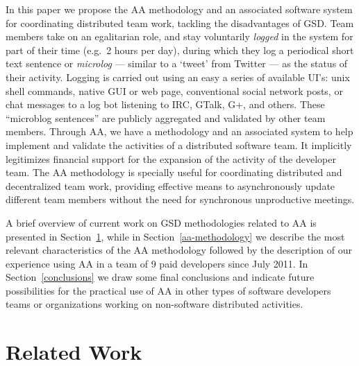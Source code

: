 \documentclass{article}
\newcommand{\indraftnote}[1]{}
\newcommand{\todo}[1]{\indraftnote{todo: #1}}
\begin{document}
In this paper we propose the AA methodology and an associated software system
for coordinating distributed team work, tackling the disadvantages
of GSD. Team members take on an egalitarian role, and stay
voluntarily \textit{logged} in the system for part of their time
(e.g.\ 2 hours per day), during which they log a periodical short text
sentence or \emph{microlog} --- similar to a `tweet' from Twitter --- as the
status of their activity. Logging is carried out using an easy a series of
available UI's: unix shell
commands, native GUI or web page, conventional social network posts, or chat messages to a log bot
listening to IRC, GTalk, G+, and others.  These ``microblog sentences'' are publicly aggregated and validated by other
team members. Through AA, we have a methodology and an associated system to help
implement and validate the activities of a distributed software team. It implicitly
legitimizes financial support for the expansion of the activity of the developer
team. The AA methodology is specially useful for coordinating distributed and
decentralized team work, providing effective means to asynchronously update
different team members without the need for synchronous unproductive meetings.


A brief overview of current work on GSD methodologies related to
AA is presented in Section~\ref{related-work}, while in
Section~\ref{aa-methodology} we describe the most relevant
characteristics of the AA methodology followed by the description of
our experience using AA in a team of 9 paid developers 
since July 2011. In Section~\ref{conclusions} we draw some final
conclusions and indicate future possibilities for the
practical use of AA in other types of software developers teams or
organizations working on non-software distributed activities.

\indraftnote{
A very good article on the value of asynchronous communication for personal
and group productivity, related to the key necessity of having moments of
introversion to avoid daily pressures of forced socialization. The way we work
on the digital age enables people to be very productive, the article also
mentions linux as a hallmark example~\cite{Thompson:Wired:2012}
}

\indraftnote{TODO: cite CIA.vc bot stuff}

\section{Related Work}
\label{related-work}
\nocite{gobbo:APSEEP2008}
\nocite{Reis:PhDThesis:2003}
\end{document}

